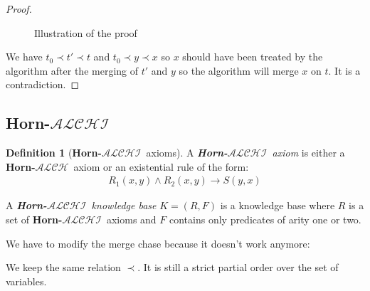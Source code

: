 \documentclass{article}
\theoremstyle{definition}
\newtheorem{definition}{Definition}[section]
\theoremstyle{remark}
\newcommand{\ALCH}{\textbf{Horn-$\mathcal{ALCH}$}}
\newcommand{\ALCHI}{\textbf{Horn-$\mathcal{ALCHI}$}}
\begin{document}
\begin{proof}
\begin{figure}
\begin{center}
\end{center}
\label{figure:proof}
\caption{Illustration of the proof}
\end{figure}

We have $t_0 \prec t' \prec t$ and $t_0 \prec y \prec x$ so $x$ should have been treated by the algorithm after the merging of $t'$ and $y$ so the algorithm will merge $x$ on $t$. It is a contradiction. 
\end{proof}


\subsection{\ALCHI}

\begin{definition}[\ALCHI\ axioms]
A \emph{\ALCHI\ axiom} is either a \ALCH\ axiom or an existential rule of the form:
\begin{align}
R_1(x,y) \wedge R_2(x,y) \rightarrow S(y,x)
\end{align}

A \emph{\ALCHI\ knowledge base} $K = (R,F)$ is a knowledge base where $R$ is a set of \ALCHI\ axioms and $F$ contains only predicates of arity one or two. 

\end{definition}

We have to modify the merge chase because it doesn't work anymore:

We keep the same relation $\prec$. It is still a strict partial order over the set of variables.





\end{document}
